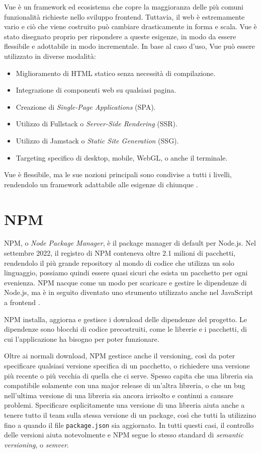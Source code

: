 Vue è un framework ed ecosistema che copre la maggioranza delle più comuni funzionalità richieste nello sviluppo frontend. Tuttavia, il web è estremamente vario e ciò che viene costruito può cambiare drasticamente in forma e scala. Vue è stato disegnato proprio per rispondere a queste esigenze, in modo da essere flessibile e adottabile in modo incrementale. In base al caso d'uso, Vue può essere utilizzato in diverse modalità:
\begin{itemize}
    \item Miglioramento di HTML statico senza necessità di compilazione.
    \item Integrazione di componenti web su qualsiasi pagina.
    \item Creazione di \textit{Single-Page Applications} (SPA).
    \item Utilizzo di Fullstack o \textit{Server-Side Rendering} (SSR).
    \item Utilizzo di Jamstack o \textit{Static Site Generation} (SSG).
    \item Targeting specifico di desktop, mobile, WebGL, o anche il terminale.
\end{itemize}
Vue è flessibile, ma le sue nozioni principali sono condivise a tutti i livelli, rendendolo un framework adattabile alle esigenze di chiunque \cite{Vue}.


\section{NPM}
NPM, o \textit{Node Package Manager}, è il package manager di default per Node.js. Nel settembre 2022, il registro di NPM conteneva oltre 2.1 milioni di pacchetti, rendendolo il più grande repository al mondo di codice che utilizza un solo linguaggio, possiamo quindi essere quasi sicuri che esista un pacchetto per ogni evenienza. NPM nacque come un modo per scaricare e gestire le dipendenze di Node.js, ma è in seguito diventato uno strumento utilizzato anche nel JavaScript a frontend \cite{NPM_Package_Manager, NPM_Docs}.

NPM installa, aggiorna e gestisce i download delle dipendenze del progetto. Le dipendenze sono blocchi di codice precostruiti, come le librerie e i pacchetti, di cui l'applicazione ha bisogno per poter funzionare.

Oltre ai normali download, NPM gestisce anche il versioning, così da poter specificare qualsiasi versione specifica di un pacchetto, o richiedere una versione più recente o più vecchia di quella che ci serve. Spesso capita che una libreria sia compatibile solamente con una major release di un'altra libreria, o che un bug nell'ultima versione di una libreria sia ancora irrisolto e continui a causare problemi. Specificare esplicitamente una versione di una libreria aiuta anche a tenere tutto il team sulla stessa versione di un package, così che tutti la utilizzino fino a quando il file \Verb_package.json_ sia aggiornato. In tutti questi casi, il controllo delle versioni aiuta notevolmente e NPM segue lo stesso standard di \textit{semantic versioning}, o \textit{semver}.

